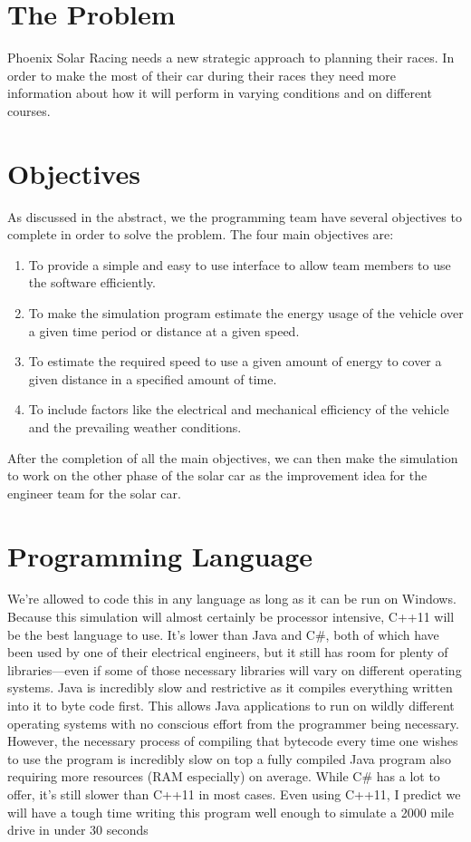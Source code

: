 \documentclass[onecolumn, draftclsnofoot,10pt, compsoc]{IEEEtran}
\begin{document}
\newpage
{}
\tableofcontents
\clearpage


\section{The Problem}
Phoenix Solar Racing needs a new strategic approach to planning their races. 
In order to make the most of their car during their races they need more information about how it will perform in varying conditions and on different courses. 

\section{Objectives}
As discussed in the abstract, we the programming team have several objectives to complete in order to solve the problem. 
The four main objectives are: 
\begin{enumerate}
    \item To provide a simple and easy to use interface to allow team members to use the software efficiently. 
    \item To make the simulation program estimate the energy usage of the vehicle over a given time period or distance at a given speed.
    \item To estimate the required speed to use a given amount of energy to cover a given distance in a specified amount of time. 
    \item To include factors like the electrical and mechanical efficiency of the vehicle and the prevailing weather conditions. 
\end{enumerate}
After the completion of all the main objectives, we can then make the simulation to work on the other phase of the solar car as the improvement idea for the engineer team for the solar car.

\section{Programming Language}
We're allowed to code this in any language as long as it can be run on Windows. 
Because this simulation will almost certainly be processor intensive, C++11 will be the best language to use. 
It's lower than Java and C\#, both of which have been used by one of their electrical engineers, but it still has room for plenty of libraries---even if some of those necessary libraries will vary on different operating systems. 
Java is incredibly slow and restrictive as it compiles everything written into it to byte code first. 
This allows Java applications to run on wildly different operating systems with no conscious effort from the programmer being necessary. 
However, the necessary process of compiling that bytecode every time one wishes to use the program is incredibly slow on top a fully compiled Java program also requiring more resources (RAM especially) on average. 
While C\# has a lot to offer, it's still slower than C++11 in most cases. 
Even using C++11, I predict we will have a tough time writing this program well enough to simulate a 2000 mile drive in under 30 seconds
\end{document}
